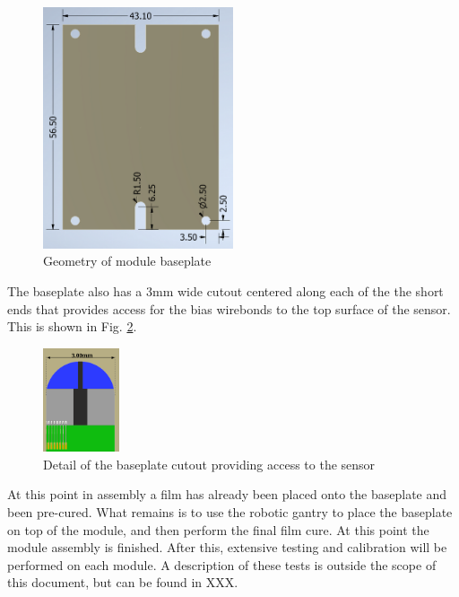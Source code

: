 \documentclass[10pt]{datasheet}
\begin{document}
\begin{figure}[h]
	\centering
	\includegraphics[width=0.5\textwidth,angle=-90]{figures/baseplate.png}
	\caption{Geometry of module baseplate}
	\label{fig:baseplate}	
\end{figure}

The baseplate also has a 3mm wide cutout centered along each of the the short ends that provides access for the bias wirebonds to the top surface of the sensor. This is shown in Fig. \ref{fig:baseplate-detail}.

\begin{figure}[h]
	\centering
	\includegraphics[width=0.2\textwidth]{figures/baseplate-detail.png}
	\caption{Detail of the baseplate cutout providing access to the sensor}
	\label{fig:baseplate-detail}	
\end{figure}

At this point in assembly a film has already been placed onto the baseplate and been pre-cured. What remains is to use the robotic gantry to place the baseplate on top of the module, and then perform the final film cure. At this point the module assembly is finished. After this, extensive testing and calibration will be performed on each module. A description of these tests is outside the scope of this document, but can be found in XXX.
\end{document}
